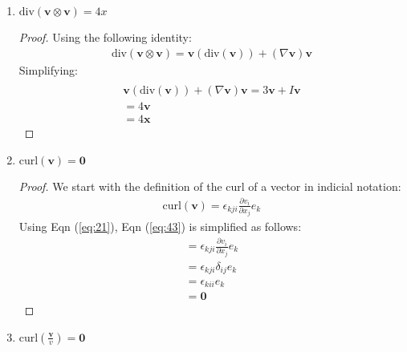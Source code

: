 \begin{enumerate}
\begin{proof}
            Substituting Eqns (\ref{eq:36}) and (\ref{eq:24}) into Eqn (\ref{eq:20}):
            \begin{align}
                \frac{3}{x}+\mathbf{x}\cdot\left( -\frac{\mathbf{x}}{x^3} \right) \\
                =\frac{2}{x}
                \end{align}
        \end{proof}
        \item $\text{div}(\mathbf{v}\otimes \mathbf{v})=4x$
        \begin{proof}
            Using the following identity:
            \begin{align}
                \text{div}(\mathbf{v}\otimes \mathbf{v})=\mathbf{v}(\text{div}(\mathbf{v}))+(\nabla \mathbf{v})\mathbf{v}
                \end{align}
            Simplifying:
            \begin{align} \\
                \mathbf{v}(\text{div}(\mathbf{v}))+(\nabla \mathbf{v})\mathbf{v} =
                3\mathbf{v}+I\mathbf{v} \\
                =4\mathbf{v} \\
                =4\mathbf{x}
                \end{align}
        \end{proof}
        \pagebreak
        \item $\text{curl}(\mathbf{v})=\mathbf{0}$
        \begin{proof}
            We start with the definition of the curl of a vector in indicial notation:
            \begin{align}
                \text{curl}(\mathbf{v})=\epsilon_{kji}\frac{ \partial v_{i} }{ \partial x_{j} } e_{k} \label{eq:43}
                \end{align}
            Using Eqn (\ref{eq:21}), Eqn (\ref{eq:43}) is simplified as follows:
            \begin{align}
                =\epsilon_{kji}\frac{ \partial v_{i} }{ \partial x_{j} } e_{k} \\
                =\epsilon_{kji}\delta_{ij}e_{k} \\
                =\epsilon_{kii}e_{k} \\
                =\mathbf{0} \label{eq:47}
                \end{align}
        \end{proof}
        \item $\text{curl}\left( \frac{\mathbf{v}}{v} \right)=\mathbf{0}$

\end{enumerate}
